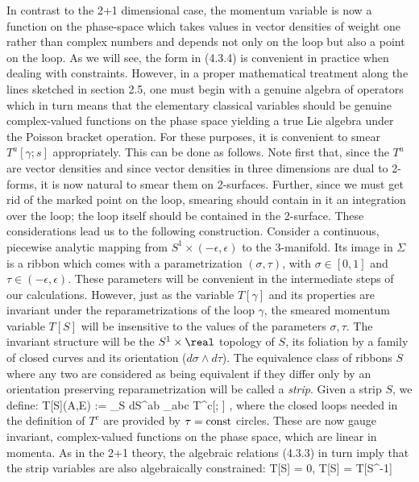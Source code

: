In contrast to
the 2+1 dimensional case, the momentum variable is now a function
on the phase-space which takes values in vector densities of weight one
rather than complex numbers and depends not only on the loop but also a point
on the loop. As we will see, the form in (4.3.4) is convenient in practice
when dealing with constraints. However, in a proper mathematical treatment
along the lines sketched in section 2.5, one must begin with a genuine
algebra of operators which in turn means that the elementary classical
variables should be genuine complex-valued functions on the phase space
yielding a true Lie algebra under the Poisson bracket operation. For these
purposes, it is convenient to smear $T^a[\gamma; s]$ appropriately. This
can be done as follows. Note first that, since the $T^a$ are vector densities
and since vector densities in three dimensions are dual to 2-forms, it is
now natural to smear them on 2-surfaces. Further, since we must get rid of
the marked point on the loop, smearing should contain in it an integration
over the loop; the loop itself should be contained in the 2-surface. These
considerations lead us to the following construction. Consider a continuous,
piecewise analytic mapping from $S^1\times (-\epsilon,\epsilon)$ to the
3-manifold. Its image in $\Sigma$ is a ribbon which comes with
a parametrization $(\sigma,\tau )$, with $\sigma \in [0,1]$ and $\tau
\in (-\epsilon, \epsilon)$. These parameters will be convenient in the
intermediate steps of our calculations. However, just as the variable
$T[\gamma ]$ and its properties are invariant under the reparametrizations
of the loop $\gamma$, the smeared momentum variable $T[S]$ will be
insensitive to the values of the parameters $\sigma, \tau$. The invariant
structure will be the $S^1\times \real$ topology of $S$, its foliation
by a family of closed curves and its orientation ($d\sigma\wedge d\tau$).
The equivalence class of ribbons $S$ where any two are considered as being
equivalent if they differ only by an orientation preserving reparametrization
will be called a {\it strip}. Given a strip $S$, we define:
\bneq
T[S](A,E) := \lint_S\- dS^{ab}\-\- \eta_{abc}\-\- T^c[\tau; \sigma] ,
where the closed loops needed in the definition of $T^c$ are provided by
$\tau = {\rm const}$ circles. These are now gauge invariant, complex-valued
functions on the phase space, which are linear in momenta. As in the 2+1
theory, the algebraic relations (4.3.3) in turn imply that the strip
variables are also algebraically constrained:
\bneq
T[S] = 0, \quad T[S] = T[S^{-1}]  \quad
